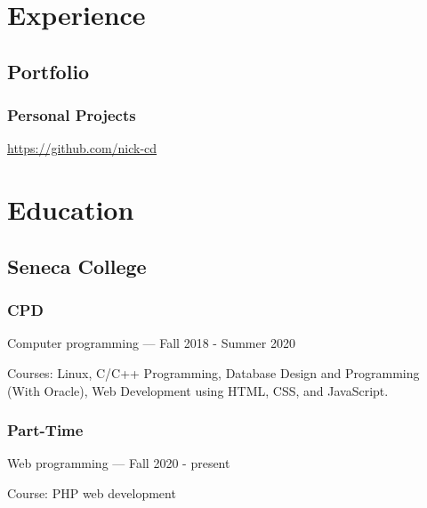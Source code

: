 \documentclass{article}
\begin{document}
\section{Experience}

\subsection{Portfolio}

\subsubsection{Personal Projects}

\url{https://github.com/nick-cd}

\section{Education}

\subsection{Seneca College}

\subsubsection{CPD}

Computer programming --- Fall 2018 - Summer 2020

Courses: Linux, C/C++ Programming, Database Design and Programming
(With Oracle), Web Development using HTML, CSS, and JavaScript.

\subsubsection{Part-Time}

Web programming --- Fall 2020 - present

Course: PHP web development
\end{document}
